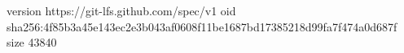 version https://git-lfs.github.com/spec/v1
oid sha256:4f85b3a45e143ec2e3b043af0608f11be1687bd17385218d99fa7f474a0d687f
size 43840
